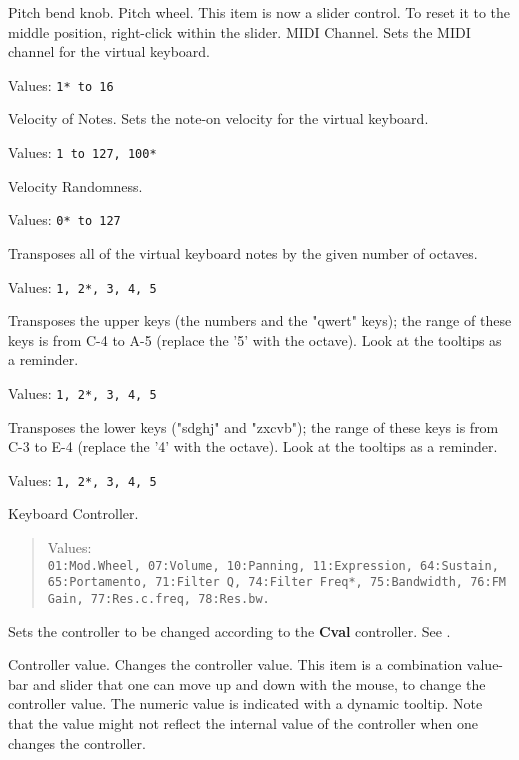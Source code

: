    \setcounter{ItemCounter}{0}      %

   Pitch bend knob. Pitch wheel.
   This item is now a slider control.  To reset it to the middle position,
   right-click within the slider.
   MIDI Channel.
   Sets the MIDI channel for the virtual keyboard.

   Values: \texttt{1* to 16}

   Velocity of Notes.
   Sets the note-on velocity for the virtual keyboard.

   Values: \texttt{1 to 127, 100*}

   Velocity Randomness.

   Values: \texttt{0* to 127}

   Transposes all of the virtual keyboard notes by the given number of
   octaves.

   Values: \texttt{1, 2*, 3, 4, 5}

   Transposes the upper keys (the numbers and the "qwert" keys);
   the range of these keys is from C-4 to A-5 (replace the '5' with the octave).
   Look at the tooltips as a reminder.

   Values: \texttt{1, 2*, 3, 4, 5}

   Transposes the lower keys ("sdghj" and "zxcvb"); the range of these keys is
   from C-3 to E-4 (replace the '4' with the octave).  Look at the tooltips as a
   reminder.

   Values: \texttt{1, 2*, 3, 4, 5}

   Keyboard Controller.
   \begin{quote}
   Values:\\
   \texttt{01:Mod.Wheel, 07:Volume, 10:Panning,
      11:Expression, 64:Sustain, 65:Portamento, 71:Filter Q,
      74:Filter Freq*, 75:Bandwidth, 76:FM Gain,
      77:Res.c.freq, 78:Res.bw.}
    \end{quote}

   Sets the controller to be changed according to the \textbf{Cval}
   controller.
   See .

   Controller value.
   Changes the controller value.
   This item is a combination value-bar and slider that one
   can move up and down with the mouse, to change the controller value. The
   numeric value is indicated with a dynamic tooltip. Note that the value might
   not reflect the internal value of the controller when one changes the
   controller.

